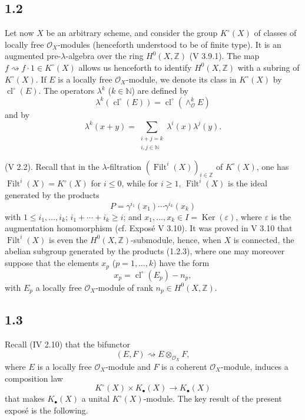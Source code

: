\documentclass[11pt]{article}
\providecommand{\Filt}{\operatorname{Filt}}
\providecommand{\cl}{\operatorname{cl}}
\providecommand{\Ker}{\operatorname{Ker}}
\begin{document}
\subsection*{1.2}
Let now $X$ be an arbitrary scheme, and consider the group $K^\circ(X)$ of
classes of locally free $\mathcal O_X$-modules (henceforth understood to be of
finite type). It is an augmented pre-$\lambda$-algebra over the ring
$H^0(X,\mathbb Z)$ (V 3.9.1). The map
$f\rightsquigarrow f\cdot1\in K^\circ(X)$ allows us henceforth to identify
$H^0(X,\mathbb Z)$ with a subring of $K^\circ(X)$. If $E$ is a locally free
$\mathcal O_X$-module, we denote its class in $K^\circ(X)$ by
$\cl^\circ(E)$. The operators $\lambda^k$ ($k\in\mathbb N$) are defined by
\begin{equation}\tag{1.2.1}
\lambda^k(\cl^\circ(E))=\cl^\circ(\wedge_{\mathcal O}^kE)
\end{equation}
and by
\begin{equation}\tag{1.2.2}
\lambda^k(x+y)=
\sum_{\substack{i+j=k\\ i,j\in\mathbb N}}\lambda^i(x)\lambda^j(y).
\end{equation}

(V 2.2). Recall that in the $\lambda$-filtration
$(\Filt^i(X))_{i\in\mathbb Z}$ of $K^\circ(X)$, one has
$\Filt^i(X)=K^\circ(X)$ for $i\leq0$, while for $i\geq1$, $\Filt^i(X)$ is
the ideal generated by the products
\begin{equation}\tag{1.2.3}
P=\gamma^{i_1}(x_1)\cdots\gamma^{i_k}(x_k)
\end{equation}
with $1\leq i_1,\ldots,i_k$; $i_1+\cdots+i_k\geq i$; and
$x_1,\ldots,x_k\in I=\Ker(\varepsilon)$, where $\varepsilon$ is the
augmentation homomorphism (cf. Expos\'e V 3.10). It was proved in V 3.10 that
$\Filt^i(X)$ is even the $H^0(X,\mathbb Z)$-submodule, hence, when $X$ is
connected, the abelian subgroup generated by the products (1.2.3), where one
may moreover suppose that the elements $x_p$ ($p=1,\ldots,k$) have the form
\begin{equation}\tag{1.2.4}
x_p=\cl^\circ(E_p)-n_p,
\end{equation}
with $E_p$ a locally free $\mathcal O_X$-module of rank
$n_p\in H^0(X,\mathbb Z)$.

\subsection*{1.3}
Recall (IV 2.10) that the bifunctor
\[
(E,F)\rightsquigarrow E\otimes_{\mathcal O_X}F,
\]
where $E$ is a locally free $\mathcal O_X$-module and $F$ is a coherent
$\mathcal O_X$-module, induces a composition law
\begin{equation}\tag{1.3.1}
K^\circ(X)\times K_\bullet(X)\longrightarrow K_\bullet(X)
\end{equation}
that makes $K_\bullet(X)$ a unital $K^\circ(X)$-module. The key result of the
present expos\'e is the following.
\end{document}
